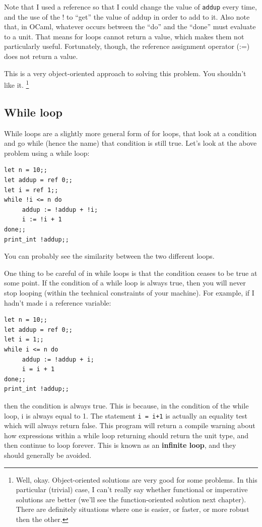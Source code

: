 \documentclass[10pt]{book}
\begin{document}
{Note that I used a reference so that I could change the value of {\tt addup} every time, 
and the use of the ! to ``get'' the value of addup in order to add to it. Also note that, 
in OCaml, whatever occurs between the ``do'' and the ``done'' must evaluate to a unit. 
That means for loops cannot return a value, which makes them not particularly useful. 
Fortunately, though, the reference assignment operator (:=) does not return a value.

This is a very object-oriented approach to solving this problem. You shouldn't like it.
\footnote{Well, okay. Object-oriented solutions are very good for some problems. In this 
particular (trivial) case, I can't really say whether functional or imperative solutions 
are better (we'll see the function-oriented solution next chapter). There are definitely 
situations where one is easier, or faster, or more robust then the other.}

\subsection{While loop}

While loops are a slightly more general form of for loops, that look at a condition and
go while (hence the name) that condition is still true. Let's look at the above problem
using a while loop:

\beforeverb
\begin{verbatim}
let n = 10;;
let addup = ref 0;;
let i = ref 1;;
while !i <= n do
     addup := !addup + !i;
     i := !i + 1
done;;
print_int !addup;;
\end{verbatim}
\afterverb

You can probably see the similarity between the two different loops.

One thing to be careful of in while loops is that the condition ceases to be true at 
some point. If the condition of a while loop is always true, then you will never stop 
looping (within the technical constraints of your machine). For example, if I hadn't
made i a reference variable:
\beforeverb
\begin{verbatim}
let n = 10;;
let addup = ref 0;;
let i = 1;;
while i <= n do
     addup := !addup + i;
     i = i + 1
done;;
print_int !addup;;
\end{verbatim}
\afterverb
then the condition is always true. This is because, in the condition of the while loop,
i is always equal to 1. The statement {\tt i = i+1} is actually an equality test which will always
return false. This program will return a compile warning about how expressions within a while loop 
returning should return the unit type, and then continue to loop forever. This is known as
an {\bf infinite loop}, and they should generally be avoided.

}
\end{document}

